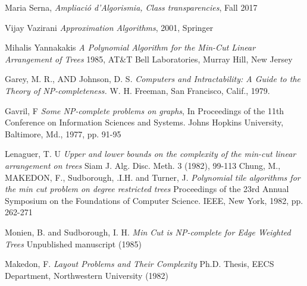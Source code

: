 \begin{thebibliography}{9}

  Maria Serna,
  \emph{Ampliació d'Algorismia, Class transparencies},
  Fall 2017

  Vijay Vazirani
  \emph{Approximation Algorithms},
  2001, Springer

  Mihalis Yannakakis
  \emph{A Polynomial Algorithm for the Min-Cut Linear Arrangement of Trees}
  1985, AT\&T Bell Laboratories, Murray Hill, New Jersey 

  Garey, M. R., AND Johnson, D. S. 
  \emph{Computers and Intractability: A Guide to the Theory of NP-completeness.}
  W. H. Freeman, San Francisco, Calif., 1979. 

  Gavril, F
  \emph{Some NP-complete problems on graphs},
  In Proceedings of the 11th Conference on Information Sciences and Systems. Johns Hopkins University, Baltimore, Md., 1977, pp. 91-95

   Lenaguer, T. U
   \emph{Upper and lower bounds on the complexity of the min-cut linear arrangement on trees }
   Siam J. Alg. Disc. Meth. 3 (1982), 99-113
   Chung, M., MAKEDON, F., Sudborough, .I.H. and Turner, J.
   \emph{Polynomial tile algorithms for the min cut problem on degree restricted trees}
   Proceedings of the 23rd Annual Symposium on the Foundations of Computer Science. IEEE, New York, 1982, pp. 262-271	

 Monien, B. and Sudborough, I. H. 
 \emph{Min Cut is NP-complete for Edge Weighted Trees}
 Unpublished manuscript (1985)

 Makedon, F.
 \emph{Layout Problems and Their Complexity}
 Ph.D. Thesis, EECS Department, Northwestern University (1982)

\end{thebibliography}
